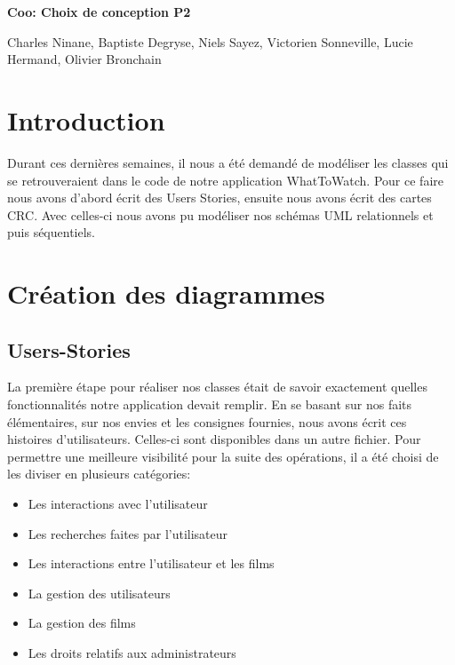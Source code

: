 \documentclass[10pt,a4paper]{article}
\begin{document}
\begin{center}

\Huge{\textbf{Coo: Choix de conception P2}}

 

\large{Charles Ninane, Baptiste Degryse, Niels Sayez, Victorien Sonneville, Lucie Hermand, Olivier Bronchain}

 

\end{center}

 

\section{Introduction}

    Durant ces dernières semaines, il nous a été demandé de modéliser les classes qui se retrouveraient dans le code de notre application WhatToWatch. Pour ce faire nous avons d'abord écrit des Users Stories, ensuite nous avons écrit des cartes CRC. Avec celles-ci nous avons pu modéliser nos schémas UML relationnels et puis séquentiels.

\section{Création des diagrammes}

\subsection{Users-Stories}

    La première étape pour réaliser nos classes était de savoir exactement quelles fonctionnalités notre application devait remplir. En se basant sur nos faits élémentaires, sur nos envies et les consignes fournies, nous avons écrit ces histoires d'utilisateurs. Celles-ci sont disponibles dans un autre fichier. Pour permettre une meilleure visibilité pour la suite des opérations, il a été choisi de les diviser en plusieurs catégories:

    \begin{itemize}

        \item Les interactions avec l'utilisateur

        \item Les recherches faites par l'utilisateur

        \item Les interactions entre l'utilisateur et les films

        \item La gestion des utilisateurs

        \item La gestion des films

        \item Les droits relatifs aux administrateurs

    \end{itemize}
\end{document}
